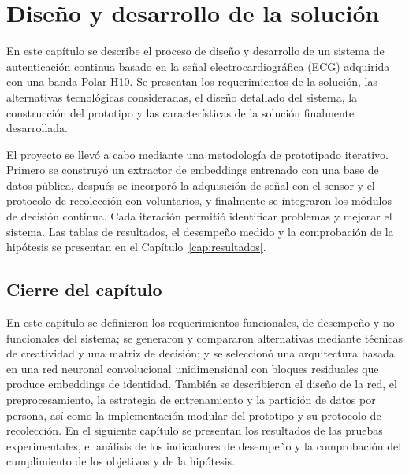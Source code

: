 %
%

\newcommand{\pendiente}[1]{\textbf{\textcolor{red}{[POR DEFINIR: #1]}}}

\chapter{Diseño y desarrollo de la solución}
\label{cap:diseno}

En este capítulo se describe el proceso de diseño y desarrollo de un sistema de autenticación continua basado en la señal electrocardiográfica (ECG) adquirida con una banda Polar H10. Se presentan los requerimientos de la solución, las alternativas tecnológicas consideradas, el diseño detallado del sistema, la construcción del prototipo y las características de la solución finalmente desarrollada.

El proyecto se llevó a cabo mediante una metodología de prototipado iterativo. Primero se construyó un extractor de embeddings entrenado con una base de datos pública, después se incorporó la adquisición de señal con el sensor y el protocolo de recolección con voluntarios, y finalmente se integraron los módulos de decisión continua. Cada iteración permitió identificar problemas y mejorar el sistema. Las tablas de resultados, el desempeño medido y la comprobación de la hipótesis se presentan en el Capítulo~\ref{cap:resultados}.







\section*{Cierre del capítulo}

En este capítulo se definieron los requerimientos funcionales, de desempeño y no funcionales del sistema; se generaron y compararon alternativas mediante técnicas de creatividad y una matriz de decisión; y se seleccionó una arquitectura basada en una red neuronal convolucional unidimensional con bloques residuales que produce embeddings de identidad. También se describieron el diseño de la red, el preprocesamiento, la estrategia de entrenamiento y la partición de datos por persona, así como la implementación modular del prototipo y su protocolo de recolección. En el siguiente capítulo se presentan los resultados de las pruebas experimentales, el análisis de los indicadores de desempeño y la comprobación del cumplimiento de los objetivos y de la hipótesis.
